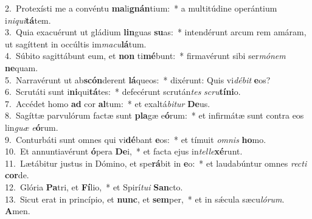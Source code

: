 {2.~}Protexísti me a convéntu \textbf{ma}li\textbf{gnán}tium:~* a multitúdine operántium i\textit{ni}\textit{qui}\textbf{tá}tem.\\
{3.~}Quia exacuérunt ut gládium \textbf{lin}guas \textbf{su}as:~* intendérunt arcum rem amáram, ut sagíttent in occúltis im\textit{ma}\textit{cu}\textbf{lá}tum.\\
{4.~}Súbito sagittábunt eum, et \textbf{non} ti\textbf{mé}bunt:~* firmavérunt sibi ser\textit{mó}\textit{nem} \textbf{ne}quam.\\
{5.~}Narravérunt ut ab\textbf{scón}derent \textbf{lá}queos:~* dixérunt: Quis vi\textit{dé}\textit{bit} \textbf{e}os?\\
{6.~}Scrutáti sunt i\textbf{ni}qui\textbf{tá}tes:~* defecérunt scrután\textit{tes} \textit{scru}\textbf{tí}\textbf{ni}o.\\
{7.~}Accédet homo \textbf{ad} cor \textbf{al}tum:~* et exaltá\textit{bi}\textit{tur} \textbf{De}us.\\
{8.~}Sagíttæ parvulórum factæ sunt \textbf{pla}gæ e\textbf{ó}rum:~* et infirmátæ sunt contra eos lin\textit{guæ} \textit{e}\textbf{ó}rum.\\
{9.~}Conturbáti sunt omnes qui vi\textbf{dé}bant \textbf{e}os:~* et tímuit \textit{om}\textit{nis} \textbf{ho}mo.\\
{10.~}Et annuntiavérunt \textbf{ó}pera \textbf{De}i,~* et facta ejus in\textit{tel}\textit{le}\textbf{xé}runt.\\
{11.~}Lætábitur justus in Dómino, et spe\textbf{rá}bit in \textbf{e}o:~* et laudabúntur omnes \textit{re}\textit{cti} \textbf{cor}de.\\
{12.~}Glória \textbf{Pa}tri, et \textbf{Fí}lio,~* et Spirí\textit{tu}\textit{i} \textbf{San}cto.\\
{13.~}Sicut erat in princípio, et \textbf{nunc}, et \textbf{sem}per,~* et in sǽcula sæcu\textit{ló}\textit{rum}. \textbf{A}men.\\
